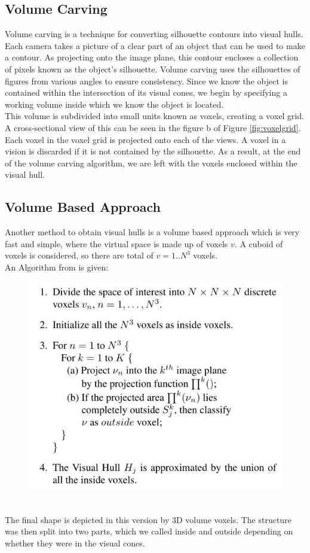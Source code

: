 \documentclass[a4paper]{report}
\begin{document}
\subsection{Volume Carving}
Volume carving is a technique for converting silhouette contours into visual hulls. Each camera takes a picture of a clear part of an object that can be used to make a contour. As projecting onto the image plane, this contour encloses a collection of pixels known as the object's silhouette. Volume carving uses the silhouettes of figures from various angles to ensure consistency.
Since we know the object is contained within the intersection of its visual cones, we begin by specifying a working volume inside which we know the object is located. 
\\
This volume is subdivided into small units known as voxels, creating a voxel grid. A cross-sectional view of this can be seen in the figure b of  Figure \ref{fig:voxelgrid}. Each voxel in the voxel grid is projected onto each of the views. A voxel in a vision is discarded if it is not contained by the silhouette. As a result, at the end of the volume carving algorithm, we are left with the voxels enclosed within the visual hull.

\subsection{Volume Based Approach}
Another method to obtain visual hulls is a volume based approach which is very fast and simple, where the  virtual space is made up of voxels \(v\). A cuboid of voxels is considered, so there are total of  \(v = 1 ..N^3\) voxels.
\\ 
An Algorithm from \cite{Schneider:2014} is given:
\begin{figure}[h]
\includegraphics[scale=0.5]{volumeCarving.jpg} 
\end{figure}
\\
The final shape is depicted in this version by 3D volume voxels. The structure was then split into two parts, which we called inside and outside depending on whether they were in the visual cones.
\end{document}
